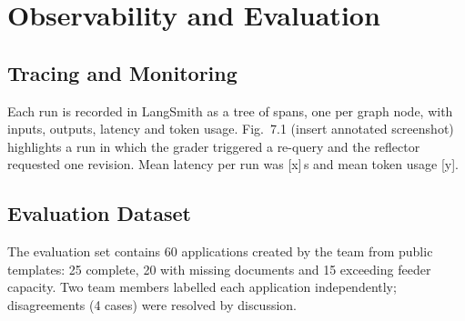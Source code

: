 \documentclass[12pt,a4paper,oneside]{report}
\newif\ifguidance
\newcommand{\guide}[1]{%
  \ifguidance
  \begin{tcolorbox}[enhanced,breakable,colback=guidebg,colframe=bmsblue,
    boxrule=0.6pt,arc=2pt,left=6pt,right=6pt,top=4pt,bottom=4pt,
    fonttitle=\bfseries\small,title={What to write here},
    before upper={\small\setstretch{1.1}}]
  #1
  \end{tcolorbox}
  \fi}
\newcommand{\dodont}[2]{%
  \ifguidance
  \begin{tcolorbox}[enhanced,breakable,sidebyside,sidebyside align=top seam,
    colback=dobg,colbacklower=dontbg,colframe=gray!60,boxrule=0.5pt,arc=2pt,
    lefthand ratio=0.5,left=5pt,right=5pt,top=4pt,bottom=4pt,
    fontupper=\small\setstretch{1.05},fontlower=\small\setstretch{1.05}]
  \textbf{\textcolor{ForestGreen}{\checkmark\ Do}}
  \begin{itemize}[leftmargin=12pt,itemsep=1pt,topsep=2pt]#1\end{itemize}
  \tcblower
  \textbf{\textcolor{BrickRed}{$\times$ Don't}}
  \begin{itemize}[leftmargin=12pt,itemsep=1pt,topsep=2pt]#2\end{itemize}
  \end{tcolorbox}
  \fi}
\newcommand{\pagebudget}[1]{%
  \ifguidance\noindent{\small\textcolor{bmsblue}{\textbf{Expected length:} #1 pages}}\par\medskip\fi}
\newenvironment{sample}
  {\par\noindent{\footnotesize\bfseries\textcolor{BrickRed}{[SAMPLE --- replace with your own content]}}\par\color{samplecol}}
  {\par\medskip}
\begin{document}
\chapter{Observability and Evaluation}
\pagebudget{4--6}
\guide{Show that you can see inside the agent (tracing) and that you measured how well it works
(evaluation). Every number in this chapter must come from your own runs.}

\section{Tracing and Monitoring}
\guide{Describe what is captured per run (steps, inputs, outputs, latency, tokens, cost) and include one
annotated trace screenshot.}
\dodont{\item Annotate the screenshot to point out the agentic behaviour.}
{\item Do not include an unreadable full-page screenshot.}
\begin{sample}
Each run is recorded in LangSmith as a tree of spans, one per graph node, with inputs, outputs, latency
and token usage. Fig.~7.1 (insert annotated screenshot) highlights a run in which the grader triggered
a re-query and the reflector requested one revision. Mean latency per run was [x]\,s and mean token
usage [y].
\end{sample}


\section{Evaluation Dataset}
\guide{Describe how the test set was built, its size, how labels were assigned and by whom, and its
class distribution. A small, carefully labelled set is better than a large, unlabelled one.}
\dodont{\item Report the class distribution.
\item Keep the test set separate from development data.}
{\item Do not tune prompts on the test set.}
\begin{sample}
The evaluation set contains 60 applications created by the team from public templates: 25 complete,
20 with missing documents and 15 exceeding feeder capacity. Two team members labelled each application
independently; disagreements (4 cases) were resolved by discussion.
\end{sample}
\end{document}
